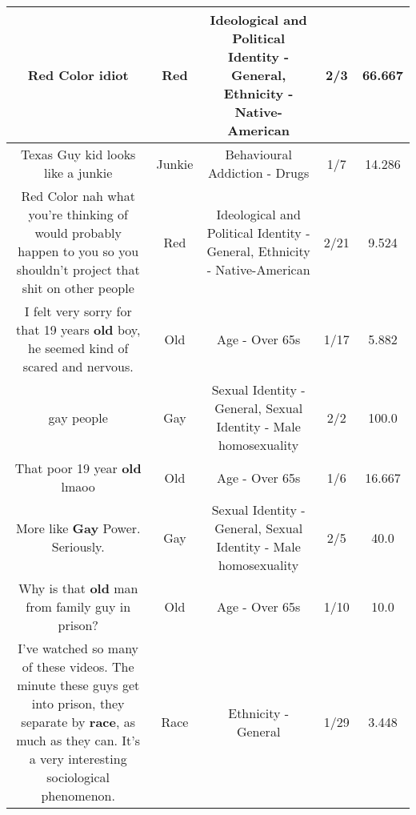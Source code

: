 \documentclass[11pt]{article}
\newlength\mylength
\begin{document}
\begin{center}
\begin{longtable}{|C{.65\mylength}|C{.30\mylength}|C{.12\mylength}|C{.12\mylength}|C{.12\mylength}|}
  \small Red Color idiot\normalsize   & Red &  Ideological and Political Identity - General, Ethnicity - Native-American & 2/3 & 66.667 \\  \hline
  \small Texas Guy kid looks like a junkie\normalsize   & Junkie & Behavioural Addiction - Drugs & 1/7 & 14.286 \\  \hline
  \small Red Color nah what you're thinking of would probably happen to you so you shouldn't project that shit on other people\normalsize   & Red &  Ideological and Political Identity - General, Ethnicity - Native-American & 2/21 & 9.524 \\  \hline
  \small I felt very sorry for that 19 years \textbf{old} boy, he seemed kind of scared and nervous.\normalsize   & Old & Age - Over 65s & 1/17 & 5.882 \\  \hline
  \small gay people\normalsize   & Gay & Sexual Identity - General, Sexual Identity - Male homosexuality & 2/2 & 100.0 \\  \hline
  \small That poor 19 year \textbf{old} lmaoo\normalsize   & Old & Age - Over 65s & 1/6 & 16.667 \\  \hline
  \small More like \textbf{G\textbf{ay}} Power. Seriously.\normalsize   & Gay & Sexual Identity - General, Sexual Identity - Male homosexuality & 2/5 & 40.0 \\  \hline
  \small Why is that \textbf{old} man from family guy in prison?\normalsize   & Old & Age - Over 65s & 1/10 & 10.0 \\  \hline
  \small I've watched so many of these videos. The minute these guys get into prison, they separate by \textbf{race}, as much as they can. It's a very interesting sociological phenomenon.\normalsize   & Race & Ethnicity - General & 1/29 & 3.448 \\  \hline

\end{longtable}
\end{center}
\end{document}
